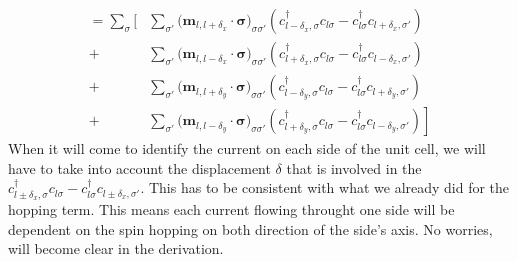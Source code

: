 \documentclass[../main.tex]{subfile}
\begin{document}
\begin{equation}\label{eq:CurrentAltermagCommu}
    \begin{aligned}
        = \sum_{\sigma}\Biggl[&
                \sum_{\sigma'}\bigl(\bm{m}_{l,l+\delta_x}\cdot\bm{\sigma}\bigr)_{\sigma\sigma'}
                \left(c_{l-\delta_x,\sigma}^{\dagger}c_{l\sigma} - c_{l\sigma}^{\dagger}c_{l+\delta_x,\sigma'} \right) \\
                +&\sum_{\sigma'}\bigl(\bm{m}_{l,l-\delta_x}\cdot\bm{\sigma}\bigr)_{\sigma\sigma'}
                \left(c_{l+\delta_x,\sigma}^{\dagger}c_{l\sigma} - c_{l\sigma}^{\dagger}c_{l-\delta_x,\sigma'} \right) \\
                +&\sum_{\sigma'}\bigl(\bm{m}_{l,l+\delta_y}\cdot\bm{\sigma}\bigr)_{\sigma\sigma'}
                \left(c_{l-\delta_y,\sigma}^{\dagger}c_{l\sigma} - c_{l\sigma}^{\dagger}c_{l+\delta_y,\sigma'} \right) \\
                +& \sum_{\sigma'}\bigl(\bm{m}_{l,l-\delta_y}\cdot\bm{\sigma}\bigr)_{\sigma\sigma'}
                \left.\left(c_{l+\delta_y,\sigma}^{\dagger}c_{l\sigma} - c_{l\sigma}^{\dagger}c_{l-\delta_y,\sigma'} \right) \right]
    \end{aligned}
\end{equation} 
When it will come to identify the current on each side of the unit cell, we will have to take into account the displacement $\delta$ that is involved in the 
$c_{l\pm\delta_x,\sigma}^{\dagger}c_{l\sigma} -c_{l\sigma}^{\dagger}c_{l\pm\delta_x,\sigma'}$.
This has to be consistent with what we already did for the hopping term. This means each current flowing throught one side will be dependent on the spin hopping on both direction 
of the side's axis. No worries, will become clear in the derivation.\\
\end{document}
